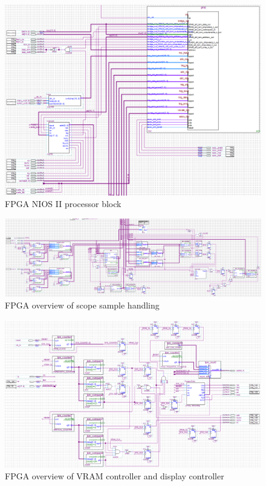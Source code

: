 \begin{appendices}
\begin{figure}[ht!]
    \centering
    \includegraphics[width=6in]{fpga_logic/proc_overview.png}
		\caption{FPGA NIOS II processor block}
\end{figure}

\begin{figure}[ht!]
    \centering
    \includegraphics[width=6in]{fpga_logic/adc_overview.png}
		\caption{FPGA overview of scope sample handling}
\end{figure}

\begin{figure}[ht!]
    \centering
    \includegraphics[width=6in]{fpga_logic/vram_disp_overview.png}
		\caption{FPGA overview of VRAM controller and display controller}
\end{figure}


\end{appendices}

